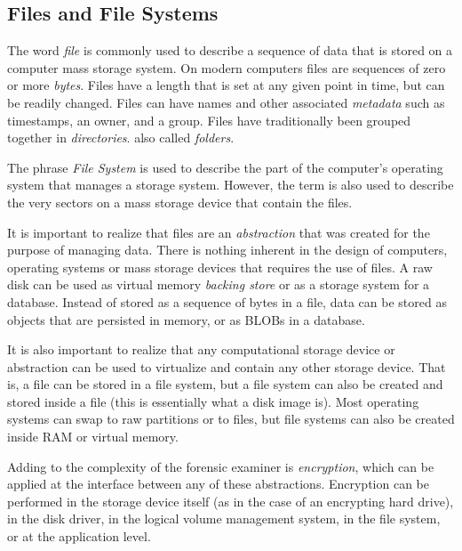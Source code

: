\documentclass[11pt,letter]{article}
\begin{document}
\subsection{Files and File Systems}
The word \emph{file} is commonly used to describe a sequence of data
that is stored on a computer mass storage system. On modern computers
files are sequences of zero or more \emph{bytes}. Files have a length
that is set at any given point in time, but can be readily
changed. Files can have names and other associated \emph{metadata}
such as timestamps, an owner, and a group. Files have traditionally
been grouped together in
\emph{directories}. also
called \emph{folders}.

The phrase \emph{File
  System} is
used to describe the part of the computer's operating system that
manages a storage system. However, the term is also used to describe
the very sectors on a mass storage device that contain the files.

It is important to realize that files are an \emph{abstraction} that
was created for the purpose of managing data. There is nothing
inherent in the design of computers, operating systems or mass storage
devices that requires the use of files. A raw disk can be used as
virtual memory \emph{backing store} or as a storage system for a
database. Instead of stored as a sequence of bytes in a file, data can be stored as
objects that are persisted in memory, or as BLOBs in a database.

It is also important to realize that any computational storage device
or abstraction can be used to virtualize and contain any other storage
device. That is, a file can be stored in a file system, but a file
system can also be created and stored inside a file (this is
essentially what a disk image is). Most operating systems can swap to raw
partitions or to files, but file systems can also be created inside
RAM or virtual memory.

Adding to the complexity of the forensic examiner is
\emph{encryption}, which can be applied at the interface between any
of these abstractions. Encryption can be performed in the storage
device itself (as in the case of an encrypting hard drive), in the
disk driver, in the logical volume management system, in the file
system, or at the application level.
\end{document}

